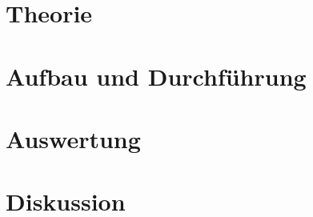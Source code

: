 


%

\newpage


\section{Theorie}


\section{Aufbau und Durchführung}


\section{Auswertung}

\newpage
\FloatBarrier

\section{Diskussion}



\nocite{*}
\printbibliography

